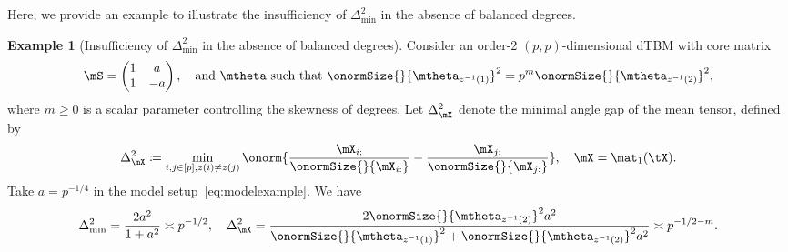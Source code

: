 \documentclass[lettersize,onecolumn,journal]{IEEEtran}
\theoremstyle{definition}
\theoremstyle{definition}
\newtheorem{example}{Example}
\begin{document}
{%
Here, we provide an example to illustrate the insufficiency of $\Delta_{\min}^2$ in the absence of balanced degrees. 



\begin{example}[Insufficiency of $\Delta_{\min}^2$ in the absence of balanced degrees] Consider an order-2 $(p,p)$-dimensional dTBM with core matrix
\begin{equation}\label{eq:modelexample}
    \mS = \begin{pmatrix} 1 &a\\
    1 & -a
    \end{pmatrix}, \quad \text{and} \ \mtheta \text{ such that } \onormSize{}{\mtheta_{z^{-1}(1)}}^2 = p^m \onormSize{}{\mtheta_{z^{-1}(2)}}^2,
\end{equation}
where $m\geq 0$ is a scalar parameter controlling the skewness of degrees. Let $\Delta_{\mX}^2$ denote the minimal angle gap of the mean tensor, defined by
\begin{equation}\label{eq:delta_x}
    \Delta_{\mX}^2 \coloneqq \min_{i,j \in [p], z(i) \neq z(j)} \onorm{ \frac{\mX_{i:}}{\onormSize{}{\mX_{i:}}}  -  \frac{\mX_{j:}}{\onormSize{}{\mX_{j:}}}  }, \quad \mX = \mat_1(\tX). %
\end{equation}
Take $ a = p^{-1/4}$ in the model setup~\eqref{eq:modelexample}. We have 
\begin{equation}
    \Delta_{\min}^2 = \frac{2 a^2}{1 + a^2} \asymp p^{-1/2}, \quad  \Delta_{\mX}^2 = \frac{2\onormSize{}{\mtheta_{z^{-1}(2)}}^{2} a^2}{\onormSize{}{\mtheta_{z^{-1}(1)}}^{2} +  \onormSize{}{\mtheta_{z^{-1}(2)}}^{2}a^2} \asymp p^{-1/2-m}.
\end{equation}

\end{example}}
\end{document}
